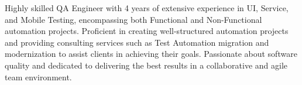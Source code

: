 

\begin{cvparagraph}

Highly skilled QA Engineer with 4 years of extensive experience in UI, Service, and Mobile Testing, encompassing both Functional and Non-Functional automation projects. Proficient in creating well-structured automation projects and providing consulting services such as Test Automation migration and modernization to assist clients in achieving their goals. Passionate about software quality and dedicated to delivering the best results in a collaborative and agile team environment.
\end{cvparagraph}